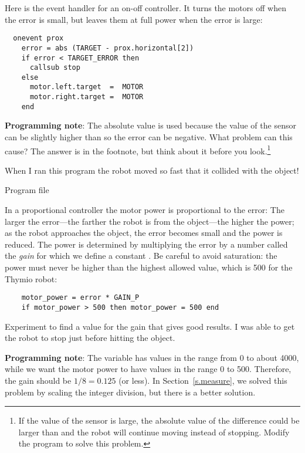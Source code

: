 Here is the event handler for an on-off controller. It turns the motors
off when the error is small, but leaves them at full power when the
error is large:

\newpage

\begin{verbatim}
  onevent prox
    error = abs (TARGET - prox.horizontal[2])
    if error < TARGET_ERROR then
      callsub stop
    else
      motor.left.target  =  MOTOR
      motor.right.target =  MOTOR
    end
\end{verbatim}

\textbf{Programming note}: The absolute value is used because the value
of the sensor can be slightly higher than  so the error can be
negative. What problem can this cause? The answer is in the footnote,
but think about it before you look.\footnote{If the value of the sensor
is large, the absolute value of the difference could be larger than
 and the robot will continue moving instead of
stopping. Modify the program to solve this problem.}

When I ran this program the robot moved so fast that it collided with
the object!


{\raggedleft \hfill Program file }

In a proportional controller the motor power is proportional to the
error: The larger the error---the farther the robot is from the
object---the higher the power; as the robot approaches the object,
the error becomes small and the power is reduced. The power is
determined by multiplying the error by a number called the \emph{gain}
for which we define a constant . Be careful to avoid
saturation: the power must never be higher than the highest allowed
value, which is 500 for the Thymio robot:

\begin{verbatim}
    motor_power = error * GAIN_P
    if motor_power > 500 then motor_power = 500 end
\end{verbatim}

Experiment to find a value for the gain that gives good results. I was
able to get the robot to stop just before hitting the object.

\textbf{Programming note}: The variable  has values in the
range from 0 to about 4000, while we want the motor power to have values
in the range 0 to 500. Therefore, the gain should be $1/8 = 0.125$ (or
less). In Section~\ref{s.measure}, we solved this problem by scaling
the integer division, but there is a better solution.

